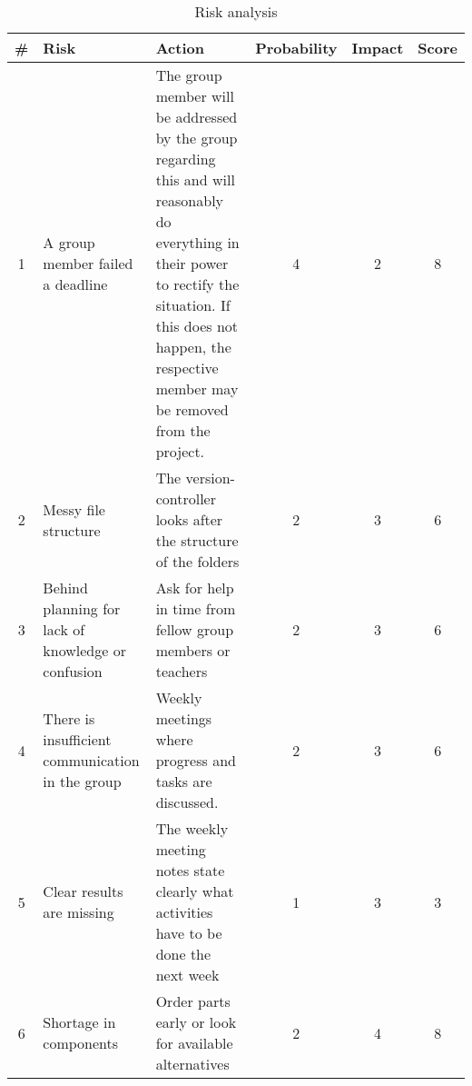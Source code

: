 \renewcommand\tabularxcolumn[1]{m{#1}}%

\begin{table}[!h]
	\begin{tabularx}{\textwidth}{|c|X|X|c|c|c|} \hline
		\# 	& Risk 													& Action 																				& Probability 	& Impact 	& Score 	\\ \hline
		1 	& A group member failed a deadline			            & The group member will be addressed by the group regarding this and will reasonably do everything in their power to rectify the situation. If this does not happen, the respective member may be removed from the project.										& 4	& 2			& \cellcolor{yellow}8	\\ \hline
		2 	& Messy file structure									& The version-controller looks after the structure of the folders						& 2	& 3			& \cellcolor{yellow}6	\\ \hline
		3 	& Behind planning for lack of knowledge or confusion	& Ask for help in time from fellow group members or teachers							& 2	& 3			& \cellcolor{yellow}6	\\ \hline
		4 	& There is insufficient communication in the group		& Weekly meetings where progress and tasks are discussed.								& 2	& 3			& \cellcolor{yellow}6	\\ \hline
		5 	& Clear results are missing								& The weekly meeting notes state clearly what activities have to be done the next week	& 1	& 3			& \cellcolor{green}3	\\ \hline
		6 	& Shortage in components								& Order parts early or look for available alternatives									& 2	& 4			& \cellcolor{yellow}8	\\ \hline
	\end{tabularx}
	\caption{Risk analysis}
	\label{tab:risk_analysis}
\end{table}